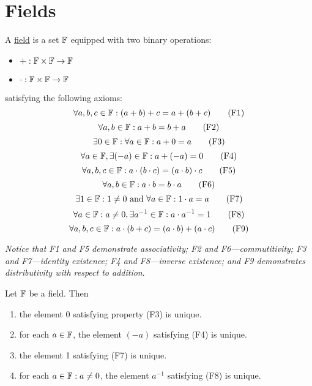 \section{Fields}
\begin{mydef}
\normalfont A \underline{field} is a set \(\mathbb{F}\) equipped with two binary operations: 
\begin{itemize}
	\item \(+: \mathbb{F} \times \mathbb{F} \to \mathbb{F}\)
	\item \(\cdot: \mathbb{F} \times \mathbb{F} \to \mathbb{F}\)
\end{itemize}
%
satisfying the following axioms:
\begin{equation}\forall a,b,c \in \mathbb{F} : (a + b) + c = a + (b + c) \tag{F1}\end{equation}
\begin{equation}\forall a,b \in \mathbb{F} : a + b = b + a \tag{F2} \end{equation}
\begin{equation}\exists 0 \in \mathbb{F} : \forall a \in \mathbb{F} : a + 0 = a \tag{F3}\end{equation}
\begin{equation}\forall a \in \mathbb{F}, \exists(-a)\in\mathbb{F}:a+(-a)=0 \tag{F4}\end{equation}
%
\begin{equation}\forall a,b,c\in\mathbb{F} : a\cdot(b \cdot c) = (a \cdot b) \cdot c \tag{F5}\end{equation}
\begin{equation}\forall a,b\in\mathbb{F} : a \cdot b = b \cdot a \tag{F6}\end{equation}
\begin{equation}\exists 1\in\mathbb{F} : 1 \ne 0 \text{ and } \forall a\in\mathbb{F} : 1\cdot a = a \tag{F7}\end{equation}
\begin{equation}\forall a\in\mathbb{F} : a\ne 0, \exists a^{-1} \in \mathbb{F} : a\cdot a^{-1} = 1 \tag{F8}\end{equation}
%
\begin{equation}\forall a,b,c\in\mathbb{F}:a\cdot(b+c) = (a\cdot b) + (a\cdot c) \tag{F9}\end{equation}

\textit{Notice that F1 and F5 demonstrate associativity; F2 and F6---commutitivity; F3 and F7---identity existence; F4 and F8---inverse existence; and F9 demonstrates distributivity with respect to addition}.
\end{mydef}

\begin{mythm}\normalfont
Let \(\mathbb{F}\) be a field. Then
\begin{enumerate}
	\item the element 0 satisfying property (F3) is unique.
	\item for each \(a \in \mathbb{F}\), the element \((-a)\) satisfying (F4) is unique.
	\item the element 1 satisfying (F7) is unique.
	\item for each \(a\in\mathbb{F} : a \ne 0\), the element \(a^{-1}\) satisfying (F8) is unique.
\end{enumerate}
\end{mythm}

